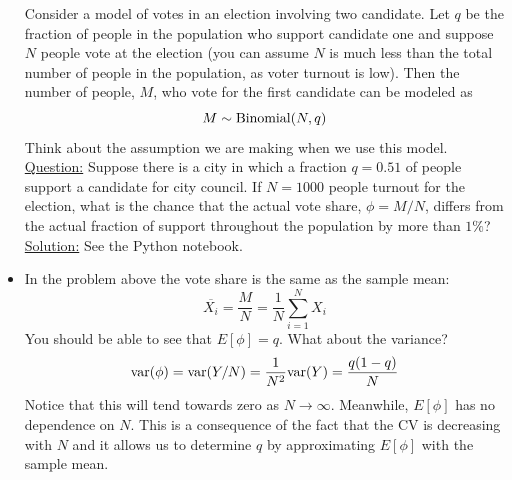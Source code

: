 \begin{itemize}
 \begin{example}
 Consider a model of votes in an election involving two candidate. Let $q$ be the fraction of people in the population who support candidate one and suppose $N$ people vote at the election (you can assume $N$ is much less than the total number of people in the population, as voter turnout is low). Then the number of people, $M$, who vote for the first candidate can be modeled as 
\begin{equation*}
M \sim {\rm Binomial}(N,q)
\end{equation*}
Think about the assumption we are making when we use this model. \\

 \noindent
\underline{Question:} Suppose there is a city in which a fraction $q = 0.51$ of people support a candidate for city council. If $N=1000$ people turnout for the election, what is the chance that the actual vote share, $\phi = M/N$, differs from the actual fraction of support throughout the population by more than $1\%$?\\

 \noindent
\underline{Solution:} See the Python notebook.
\end{example}

\item In the problem above the vote share is the same as the sample mean:
\begin{equation*}
\overline{X_i} = \frac{M}{N} =  \frac{1}{N}\sum_{i=1}^NX_i
\end{equation*}
You should be able to see that $E[\phi] = q$. What about the variance? 
 \begin{equation*}
{\rm var}(\phi) = {\rm var}(Y/N) = \frac{1}{N^2}{\rm var}(Y) = \frac{q(1-q)}{N}
 \end{equation*}
 Notice that this will tend towards zero as $N \to \infty$. Meanwhile, $E[\phi]$ has no dependence on $N$. This is a consequence of the fact that the CV is decreasing with $N$ and it allows us to determine $q$ by approximating $E[\phi]$ with the sample mean.
%
\end{itemize}





